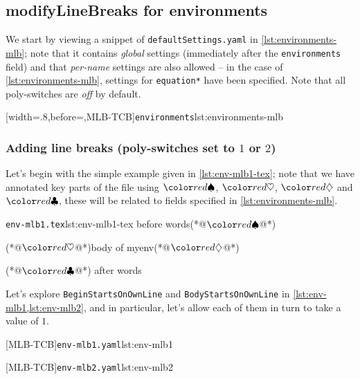 \subsection{modifyLineBreaks for environments}\label{sec:modifylinebreaks-environments}
	We start by viewing a snippet of \texttt{defaultSettings.yaml} in \cref{lst:environments-mlb}; note that it contains \emph{global} settings (immediately
	after the \texttt{environments} field) and that \emph{per-name} settings are also allowed -- in the case of \cref{lst:environments-mlb}, settings
	for \texttt{equation*} have been specified. Note that all poly-switches are \emph{off} by default.

	[width=.8\linewidth,before=\centering,MLB-TCB]{\texttt{environments}}{lst:environments-mlb}

\subsubsection{Adding line breaks (poly-switches set to $1$ or $2$)}
	Let's begin with the simple example given in \cref{lst:env-mlb1-tex}; note that we have annotated key parts of the file using $\BeginStartsOnOwnLine$,
	$\BodyStartsOnOwnLine$, $\EndStartsOnOwnLine$ and $\EndFinishesWithLineBreak$, these will be related to fields specified in \cref{lst:environments-mlb}.

	\begin{cmhlistings}[escapeinside={(*@}{@*)}]{\texttt{env-mlb1.tex}}{lst:env-mlb1-tex}
before words(*@$\BeginStartsOnOwnLine$@*) \begin{myenv}(*@$\BodyStartsOnOwnLine$@*)body of myenv(*@$\EndStartsOnOwnLine$@*)\end{myenv}(*@$\EndFinishesWithLineBreak$@*) after words
\end{cmhlistings}

	Let's explore \texttt{BeginStartsOnOwnLine} and \texttt{BodyStartsOnOwnLine} in \cref{lst:env-mlb1,lst:env-mlb2}, and in particular,
	let's allow each of them in turn to take a value of $1$.

	\begin{minipage}{.45\textwidth}
		[MLB-TCB]{\texttt{env-mlb1.yaml}}{lst:env-mlb1}
	\end{minipage}
	\hfill
	\begin{minipage}{.45\textwidth}
		[MLB-TCB]{\texttt{env-mlb2.yaml}}{lst:env-mlb2}
	\end{minipage}

